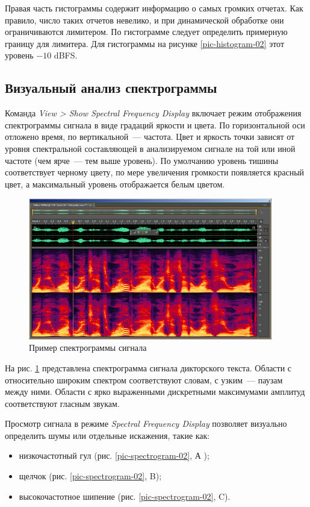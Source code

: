\documentclass[oneside, final, 14pt]{extreport}
\begin{document}
Правая часть гистограммы содержит информацию о самых громких отчетах. Как правило, число таких отчетов невелико, и при динамической обработке они ограничиваются лимитером. По гистограмме следует определить примерную границу для лимитера. Для гистограммы на рисунке  \ref{pic-histogram-02} этот уровень $-10$ dBFS.

\subsection{Визуальный анализ спектрограммы}
Команда \textit{View > Show Spectral Frequency Display} включает режим отображения спектрограммы сигнала в виде градаций яркости и цвета. По горизонтальной оси отложено время, по вертикальной~--– частота. Цвет и яркость точки зависят от уровня спектральной составляющей в анализируемом сигнале на той или иной частоте (чем ярче~--- тем выше уровень). По умолчанию уровень тишины соответствует черному цвету, по мере увеличения громкости появляется красный цвет, а максимальный уровень отображается белым цветом.

\begin{figure}[h!]
\centering
\includegraphics[width=0.95\textwidth]{pic-spectrogram-01}
\caption{Пример спектрограммы сигнала}
\label{pic-spectrogram-01}
\end{figure}

На рис. \ref{pic-spectrogram-01} представлена спектрограмма сигнала дикторского текста. Области с относительно широким спектром соответствуют словам, с узким~--- паузам между ними. Области с ярко выраженными дискретными максимумами амплитуд соответствуют гласным звукам.

Просмотр сигнала в режиме \textit{Spectral Frequency Display} позволяет визуально определить шумы или отдельные искажения, такие как: 
\begin{itemize}
\item низкочастотный гул (рис. \ref{pic-spectrogram-02}, А );
\item щелчок (рис. \ref{pic-spectrogram-02}, B);
\item высокочастотное шипение (рис. \ref{pic-spectrogram-02}, C).
\end{itemize}
\end{document}
